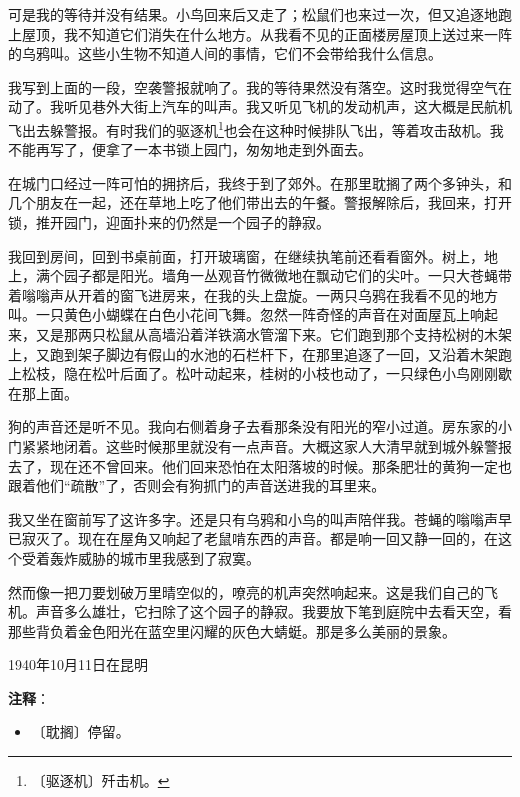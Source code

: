 \documentclass[12pt,UTF-8,openany]{ctexbook}
\begin{document}
\begin{large}
    可是我的等待并没有结果。小鸟回来后又走了；松鼠们也来过一次，但又追逐地跑上屋顶，我不知道它们消失在什么地方。从我看不见的正面楼房屋顶上送过来一阵的乌鸦叫。这些小生物不知道人间的事情，它们不会带给我什么信息。
    
    我写到上面的一段，空袭警报就响了。我的等待果然没有落空。这时我觉得空气在动了。我听见巷外大街上汽车的叫声。我又听见飞机的发动机声，这大概是民航机飞出去躲警报。有时我们的驱逐机\footnote{〔驱逐机〕歼击机。}也会在这种时候排队飞出，等着攻击敌机。我不能再写了，便拿了一本书锁上园门，匆匆地走到外面去。
    
    在城门口经过一阵可怕的拥挤后，我终于到了郊外。在那里耽搁了两个多钟头，和几个朋友在一起，还在草地上吃了他们带出去的午餐。警报解除后，我回来，打开锁，推开园门，迎面扑来的仍然是一个园子的静寂。
    
    我回到房间，回到书桌前面，打开玻璃窗，在继续执笔前还看看窗外。树上，地上，满个园子都是阳光。墙角一丛观音竹微微地在飘动它们的尖叶。一只大苍蝇带着嗡嗡声从开着的窗飞进房来，在我的头上盘旋。一两只乌鸦在我看不见的地方叫。一只黄色小蝴蝶在白色小花间飞舞。忽然一阵奇怪的声音在对面屋瓦上响起来，又是那两只松鼠从高墙沿着洋铁滴水管溜下来。它们跑到那个支持松树的木架上，又跑到架子脚边有假山的水池的石栏杆下，在那里追逐了一回，又沿着木架跑上松枝，隐在松叶后面了。松叶动起来，桂树的小枝也动了，一只绿色小鸟刚刚歇在那上面。
    
    狗的声音还是听不见。我向右侧着身子去看那条没有阳光的窄小过道。房东家的小门紧紧地闭着。这些时候那里就没有一点声音。大概这家人大清早就到城外躲警报去了，现在还不曾回来。他们回来恐怕在太阳落坡的时候。那条肥壮的黄狗一定也跟着他们“疏散”了，否则会有狗抓门的声音送进我的耳里来。
    
    我又坐在窗前写了这许多字。还是只有乌鸦和小鸟的叫声陪伴我。苍蝇的嗡嗡声早已寂灭了。现在在屋角又响起了老鼠啃东西的声音。都是响一回又静一回的，在这个受着轰炸威胁的城市里我感到了寂寞。
    
    然而像一把刀要划破万里晴空似的，嘹亮的机声突然响起来。这是我们自己的飞机。声音多么雄壮，它扫除了这个园子的静寂。我要放下笔到庭院中去看天空，看那些背负着金色阳光在蓝空里闪耀的灰色大蜻蜓。那是多么美丽的景象。
    
    \hfill 1940年10月11日在昆明
    
\end{large}


\newpage

\textbf{注释}：

\vspace{-1em}

\begin{itemize}
    \setlength\itemsep{-0.2em}
    \item 〔耽搁〕停留。
\end{itemize}
\end{document}
